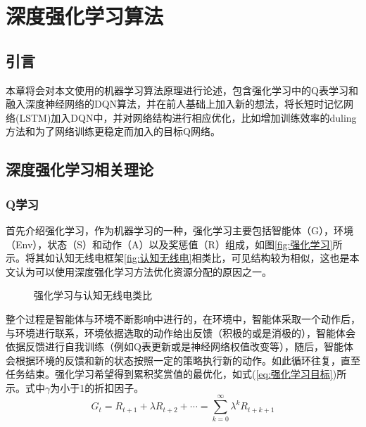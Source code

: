 \chapter{深度强化学习算法}
\section{引言}
本章将会对本文使用的机器学习算法原理进行论述，包含强化学习中的Q表学习和融入深度神经网络的DQN算法，并在前人基础上加入新的想法，将长短时记忆网络(LSTM)加入DQN中，并对网络结构进行相应优化，比如增加训练效率的duling方法和为了网络训练更稳定而加入的目标Q网络。
\section{深度强化学习相关理论}
\subsection{Q学习}
首先介绍强化学习，作为机器学习的一种，强化学习主要包括智能体（G），环境（Env），状态（S）和动作（A）以及奖惩值（R）组成，如图\ref{fig:强化学习}所示。将其如认知无线电框架\ref{fig:认知无线电}相类比，可见结构较为相似，这也是本文认为可以使用深度强化学习方法优化资源分配的原因之一。
\begin{figure}[htbp]
	\begin{minipage}{\textwidth}
		\centering
		\subfigure{\label{fig:强化学习}}\addtocounter{subfigure}{-2}
		\hspace{1em}
		\subfigure{\label{fig:认知无线电}}\addtocounter{subfigure}{-2}
		\hspace{1em}	
	\end{minipage}
	\vspace{0.2em}
	\caption{强化学习与认知无线电类比}\label{fig:强化学习类比认知无线电}
\end{figure}

整个过程是智能体与环境不断影响中进行的，在环境中，智能体采取一个动作后，与环境进行联系，环境依据选取的动作给出反馈（积极的或是消极的），智能体会依据反馈进行自我训练（例如Q表更新或是神经网络权值改变等），随后，智能体会根据环境的反馈和新的状态按照一定的策略执行新的动作。如此循环往复，直至任务结束。强化学习希望得到累积奖赏值的最优化，如式(\ref{eq:强化学习目标})所示。式中$\gamma$为小于1的折扣因子。
\begin{equation}\label{eq:强化学习目标}
G_{t}=R_{t+1}+\lambda R_{t+2}+\cdots=\sum_{k=0}^{\infty}\lambda^{k}R_{t+k+1}
\end{equation}

